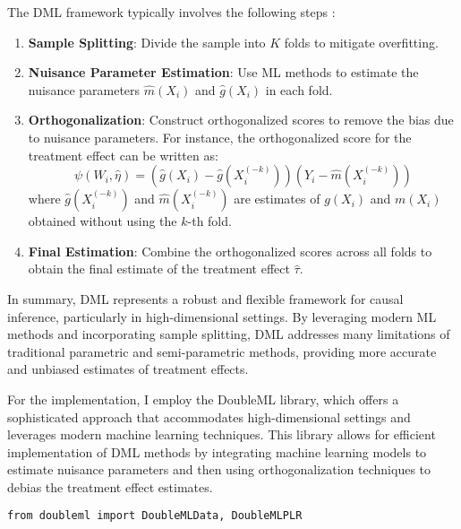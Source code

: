\documentclass{article}
\begin{document}
The DML framework typically involves the following steps \cite{chernozhukov2017doubledebiased}:
\begin{enumerate}
    \item \textbf{Sample Splitting}: Divide the sample into \(K\) folds to mitigate overfitting.
    \item \textbf{Nuisance Parameter Estimation}: Use ML methods to estimate the nuisance parameters \(\hat{m}(X_i)\) and \(\hat{g}(X_i)\) in each fold.
    \item \textbf{Orthogonalization}: Construct orthogonalized scores to remove the bias due to nuisance parameters. For instance, the orthogonalized score for the treatment effect can be written as:
    \[
    \psi(W_i, \hat{\eta}) = \left( \hat{g}(X_i) - \hat{g}(X_i^{(-k)}) \right) \left( Y_i - \hat{m}(X_i^{(-k)}) \right)
    \]
    where \(\hat{g}(X_i^{(-k)})\) and \(\hat{m}(X_i^{(-k)})\) are estimates of \(g(X_i)\) and \(m(X_i)\) obtained without using the \(k\)-th fold.
    \item \textbf{Final Estimation}: Combine the orthogonalized scores across all folds to obtain the final estimate of the treatment effect \(\hat{\tau}\).
\end{enumerate}

In summary, DML represents a robust and flexible framework for causal inference, particularly in high-dimensional settings. By leveraging modern ML methods and incorporating sample splitting, DML addresses many limitations of traditional parametric and semi-parametric methods, providing more accurate and unbiased estimates of treatment effects.

For the implementation, I employ the DoubleML library, which offers a sophisticated approach that accommodates high-dimensional settings and leverages modern machine learning techniques. This library allows for efficient implementation of DML methods by integrating machine learning models to estimate nuisance parameters and then using orthogonalization techniques to debias the treatment effect estimates.

\begin{verbatim}
from doubleml import DoubleMLData, DoubleMLPLR
\end{verbatim}
\end{document}

